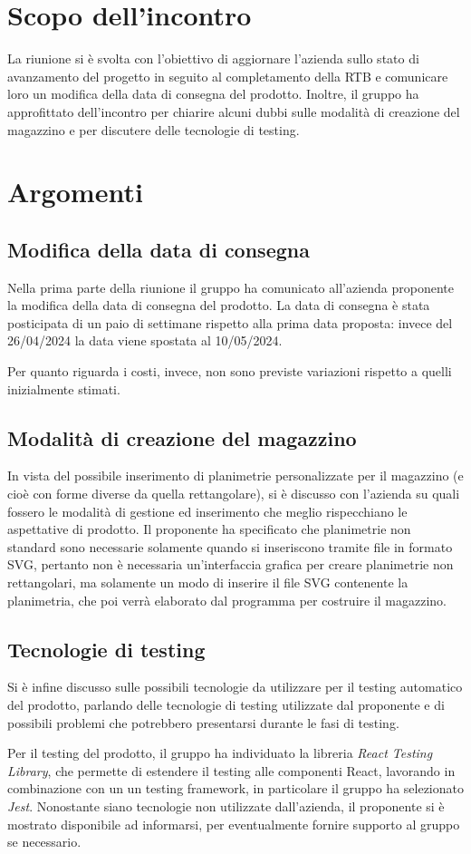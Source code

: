 \section{Scopo dell'incontro} \label{sec:scopo}
La riunione si è svolta con l'obiettivo di aggiornare l'azienda \nomeAzienda \space sullo stato di avanzamento del progetto in seguito al completamento della RTB e comunicare loro un modifica della data di consegna del prodotto. Inoltre, il gruppo ha approfittato dell'incontro per chiarire alcuni dubbi sulle modalità di creazione del magazzino e per discutere delle tecnologie di testing.

\section{Argomenti} \label{sec:argomenti}
\subsection{Modifica della data di consegna}
Nella prima parte della riunione il gruppo ha comunicato all'azienda proponente la modifica della data di consegna del prodotto.
La data di consegna è stata posticipata di un paio di settimane rispetto alla prima data proposta: invece del 26/04/2024 la data viene spostata al 10/05/2024.
\par Per quanto riguarda i costi, invece, non sono previste variazioni rispetto a quelli inizialmente stimati.

\subsection{Modalità di creazione del magazzino}
In vista del possibile inserimento di planimetrie personalizzate per il magazzino (e cioè con forme diverse da quella rettangolare), si è discusso con l'azienda su quali fossero le modalità di gestione ed inserimento che meglio rispecchiano le aspettative di prodotto. Il proponente ha specificato che planimetrie non standard sono necessarie solamente quando si inseriscono tramite file in formato SVG, pertanto non è necessaria un'interfaccia grafica per creare planimetrie non rettangolari, ma solamente un modo di inserire il file SVG contenente la planimetria, che poi verrà elaborato dal programma per costruire il magazzino.

\subsection{Tecnologie di testing}
Si è infine discusso sulle possibili tecnologie da utilizzare per il testing automatico del prodotto, parlando delle tecnologie di testing utilizzate dal proponente e di possibili problemi che potrebbero presentarsi durante le fasi di testing.
\par Per il testing del prodotto, il gruppo ha individuato la libreria \textit{React Testing Library}, che permette di estendere il testing alle componenti React, lavorando in combinazione con un un testing framework, in particolare il gruppo ha selezionato \textit{Jest}.
Nonostante siano tecnologie non utilizzate dall'azienda, il proponente si è mostrato disponibile ad informarsi, per eventualmente fornire supporto al gruppo se necessario.

